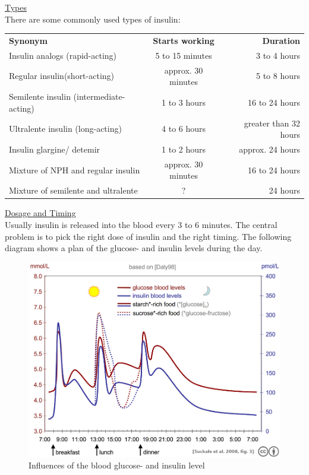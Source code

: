 \newpage
\underline{Types}\\
There are some commonly used types of insulin:\\
\begin{tabular}{lcr}
	\textbf{Synonym} & \textbf{Starts working} & \textbf{Duration}\\
	Insulin analogs (rapid-acting) & 5 to 15 minutes & 3 to 4 hours\\
	Regular insulin(short-acting) & approx. 30 minutes & 5 to 8 hours\\
	Semilente insulin (intermediate-acting) & 1 to 3 hours & 16 to 24 hours\\
	Ultralente insulin (long-acting) & 4 to 6 hours & greater than 32 hours\\
	Insulin glargine/ detemir & 1 to 2 hours & approx. 24 hours\\
	Mixture of NPH and regular insulin & approx. 30 minutes & 16 to 24 hours\\
	Mixture of semilente and ultralente & ? & 24 hours\\
\end{tabular}
\underline{Dosage and Timing}\\
Usually insulin is released into the blood every 3 to 6 minutes. The central problem is to pick the right dose of insulin 
and the right timing. The following diagram shows a plan of the glucose- and insulin levels during the day.\\
\begin{figure}[htb]
\centering
\includegraphics[width=\textwidth]{images/Suckale08_fig3_glucose_insulin_day.jpg}
\caption{Influences of the blood glucose- and insulin level}
\end{figure}
